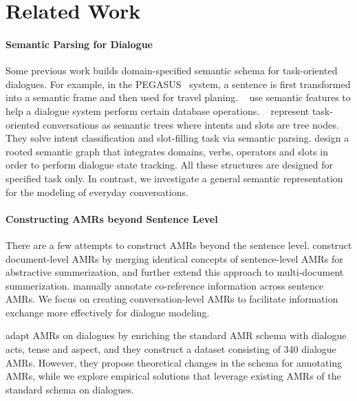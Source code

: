 \documentclass[11pt,a4paper]{article}
\begin{document}
\section{Related Work}


\paragraph{Semantic Parsing for Dialogue}
Some previous work builds domain-specified semantic schema for task-oriented dialogues.
For example, in the PEGASUS~\cite{zue-etal-1994-pegasus} system, a sentence is first transformed into a semantic frame and then used for travel planing.
~\citet{WirschingHuberKoelbletal2012} use semantic features to help a dialogue system perform certain database operations. 
~\citet{gupta-etal-2018-semantic-parsing} represent task-oriented conversations as semantic trees where intents and slots are tree nodes.
They solve intent classification and slot-filling task via semantic parsing.
\citet{ChengAABDFKKLPW20} design a rooted semantic graph that integrates domains, verbs, operators and slots in order to perform dialogue state tracking. 
All these structures are designed for specified task only. 
In contrast, we investigate a general semantic representation for the modeling of everyday conversations. 

\paragraph{Constructing AMRs beyond Sentence Level}
There are a few attempts to construct AMRs beyond the sentence level.
\citet{liu-etal-2015-toward} construct document-level AMRs by merging identical concepts of sentence-level AMRs for abstractive summerization, and \citet{liao2018abstract} further extend this approach to multi-document summerization.
\citet{o2018amr} manually annotate co-reference information across sentence AMRs.
We focus on creating conversation-level AMRs to facilitate information exchange more effectively for dialogue modeling.


\citet{bonial-etal-2020-dialogue} adapt AMRs on dialogues by enriching the standard AMR schema with dialogue acts, tense and aspect, and they construct a dataset consisting of 340 dialogue AMRs.
However, they propose theoretical changes in the schema for annotating AMRs, while we explore empirical solutions that leverage existing AMRs of the standard schema on dialogues.
\end{document}
